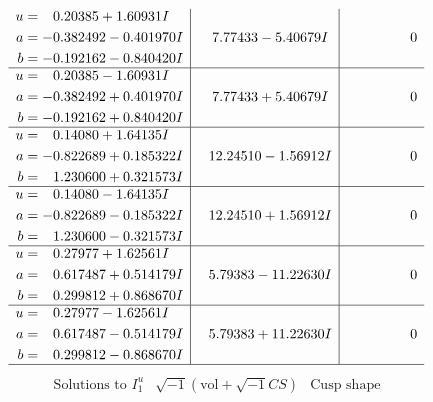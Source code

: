 \documentclass[1p]{elsarticle_modified}
\theoremstyle{definition}
\newcommand{\I}{\sqrt{-1}}
\begin{document}
$$\begin{array}{c|c|c}
\begin{aligned}
u &= \phantom{-}0.20385 + 1.60931 I \\
a &= -0.382492 - 0.401970 I \\
b &= -0.192162 - 0.840420 I\end{aligned}
 & \phantom{-}7.77433 - 5.40679 I & \phantom{-0.000000 } 0 \\ \hline\begin{aligned}
u &= \phantom{-}0.20385 - 1.60931 I \\
a &= -0.382492 + 0.401970 I \\
b &= -0.192162 + 0.840420 I\end{aligned}
 & \phantom{-}7.77433 + 5.40679 I & \phantom{-0.000000 } 0 \\ \hline\begin{aligned}
u &= \phantom{-}0.14080 + 1.64135 I \\
a &= -0.822689 + 0.185322 I \\
b &= \phantom{-}1.230600 + 0.321573 I\end{aligned}
 & \phantom{-}12.24510 - 1.56912 I & \phantom{-0.000000 } 0 \\ \hline\begin{aligned}
u &= \phantom{-}0.14080 - 1.64135 I \\
a &= -0.822689 - 0.185322 I \\
b &= \phantom{-}1.230600 - 0.321573 I\end{aligned}
 & \phantom{-}12.24510 + 1.56912 I & \phantom{-0.000000 } 0 \\ \hline\begin{aligned}
u &= \phantom{-}0.27977 + 1.62561 I \\
a &= \phantom{-}0.617487 + 0.514179 I \\
b &= \phantom{-}0.299812 + 0.868670 I\end{aligned}
 & \phantom{-}5.79383 - 11.22630 I & \phantom{-0.000000 } 0 \\ \hline\begin{aligned}
u &= \phantom{-}0.27977 - 1.62561 I \\
a &= \phantom{-}0.617487 - 0.514179 I \\
b &= \phantom{-}0.299812 - 0.868670 I\end{aligned}
 & \phantom{-}5.79383 + 11.22630 I & \phantom{-0.000000 } 0\\
 \hline 
 \end{array}$$\newpage$$\begin{array}{c|c|c}  
\text{Solutions to }I^u_{1}& \I (\text{vol} + \sqrt{-1}CS) & \text{Cusp shape}\\

\end{array}$$
\end{document}
